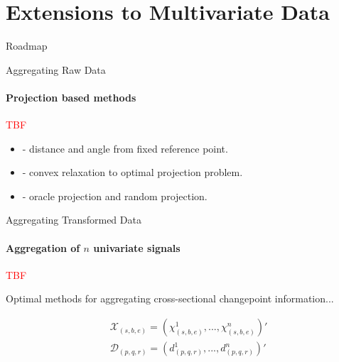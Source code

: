 \documentclass{beamer}
\begin{document}
\section{Extensions to Multivariate Data}




\begin{frame}{Roadmap}
\tableofcontents[currentsection]
\end{frame}




\begin{frame}{Aggregating Raw Data}
\framesubtitle{Projection based methods}
    
\textcolor{red}{TBF}
    
\begin{itemize}
    \item \cite{grundy2020high} - distance and angle from fixed reference point.
    \item \cite{wang2018high} - convex relaxation to optimal projection problem. 
    \item \cite{aston2014efficiency} - oracle projection and random projection. 
\end{itemize}
    
\end{frame}




\begin{frame}{Aggregating Transformed Data}
\framesubtitle{Aggregation of $n$ univariate signals}

\textcolor{red}{TBF}

Optimal methods for aggregating cross-sectional changepoint information... 

\begin{align*}
    & \mathcal{X}_{(s,b,e)} = \left (\chi_{(s,b,e)}^1, ..., \chi_{(s,b,e)}^n \right )' \\
    & \mathcal{D}_{(p,q,r)} = \left ( d_{(p,q,r)}^1, ..., d_{(p,q,r)}^n \right ) '  
\end{align*}
    
\end{frame}
\end{document}
